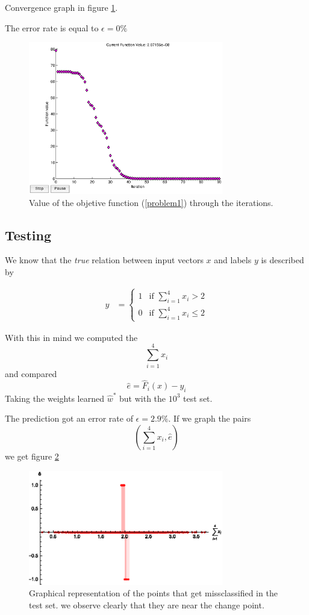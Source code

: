 \documentclass[a4paper,10pt,twocolumn]{article}
\begin{document}
Convergence graph in figure \ref{convergence}. 

The error rate is equal to $\epsilon=0\%$

\begin{figure}[!ht]
\begin{center}
\includegraphics[width=8.5cm]{conv.eps}
\caption{\label{convergence}Value of the objetive function (\ref{problem1}) through the iterations.}
\end{center}
\end{figure}

\subsection{Testing}
We know that the \emph{true} relation between input vectors $x$ and labels $y$ is described by

\begin{equation}
\begin{aligned}
y&=\begin{cases} 
1 & \text{if  }  \sum_{i=1}^4x_i >2\\ 
0 & \text{if  }  \sum_{i=1}^4x_i \leq2
\end{cases}
\end{aligned}
\end{equation}

With this in mind we computed the $$\sum_{i=1}^4x_i$$ and compared $$\hat{e}=\hat{F}_i(x)-y_i$$ Taking the weights learned $\hat{w}^*$ but with the $10^3$ test set. 

The prediction got an error rate of $\epsilon=2.9\%$. If we graph the pairs $$\left(\sum_{i=1}^4x_i,\hat{e}\right)$$ we get figure \ref{confusion}

\begin{figure}[!ht]
\begin{center}
\includegraphics[width=8.5cm]{e.eps}
\caption{Graphical representation of the points that get missclassified in the test set. we observe clearly that they are near the change point.
\label{confusion}}
\end{center}
\end{figure}
\end{document}

